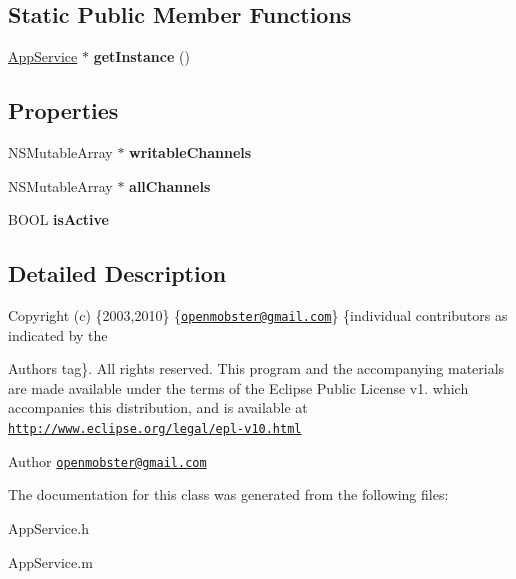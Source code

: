 \subsection*{\-Static \-Public \-Member \-Functions}
\begin{DoxyCompactItemize}
\item 
\hypertarget{interface_app_service_a904c829c0d68b5f746c167671b312e0e}{
\hyperlink{interface_app_service}{\-App\-Service} $\ast$ {\bfseries get\-Instance} ()}
\label{interface_app_service_a904c829c0d68b5f746c167671b312e0e}

\end{DoxyCompactItemize}
\subsection*{\-Properties}
\begin{DoxyCompactItemize}
\item 
\hypertarget{interface_app_service_a3c6ebf6a086faf3a74b8ada51d594a50}{
\-N\-S\-Mutable\-Array $\ast$ {\bfseries writable\-Channels}}
\label{interface_app_service_a3c6ebf6a086faf3a74b8ada51d594a50}

\item 
\hypertarget{interface_app_service_ab72e2a3fbfd51e894cd1784db66f3cc8}{
\-N\-S\-Mutable\-Array $\ast$ {\bfseries all\-Channels}}
\label{interface_app_service_ab72e2a3fbfd51e894cd1784db66f3cc8}

\item 
\hypertarget{interface_app_service_ab920054a22c43f1d93155618f4fce0cf}{
\-B\-O\-O\-L {\bfseries is\-Active}}
\label{interface_app_service_ab920054a22c43f1d93155618f4fce0cf}

\end{DoxyCompactItemize}


\subsection{\-Detailed \-Description}
\-Copyright (c) \{2003,2010\} \{\href{mailto:openmobster@gmail.com}{\tt openmobster@gmail.\-com}\} \{individual contributors as indicated by the \begin{DoxyAuthor}{\-Authors}
tag\}. \-All rights reserved. \-This program and the accompanying materials are made available under the terms of the \-Eclipse \-Public \-License v1. which accompanies this distribution, and is available at \href{http://www.eclipse.org/legal/epl-v10.html}{\tt http\-://www.\-eclipse.\-org/legal/epl-\/v10.\-html}
\end{DoxyAuthor}
\begin{DoxyAuthor}{\-Author}
\href{mailto:openmobster@gmail.com}{\tt openmobster@gmail.\-com} 
\end{DoxyAuthor}


\-The documentation for this class was generated from the following files\-:\begin{DoxyCompactItemize}
\item 
\-App\-Service.\-h\item 
\-App\-Service.\-m\end{DoxyCompactItemize}
